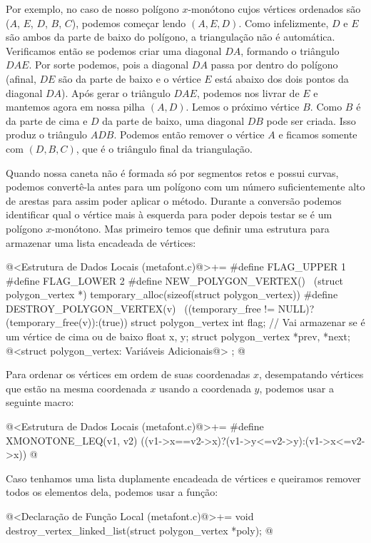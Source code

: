 {{{{{{Por exemplo, no caso de nosso polígono $x$-monótono cujos vértices
    ordenados são ($A$, $E$, $D$, $B$, $C$), podemos começar lendo $(A, E,
D)$. Como infelizmente, $D$ e $E$ são ambos da parte de baixo do
polígono, a triangulação não é automática. Verificamos então se
podemos criar uma diagonal $DA$, formando o triângulo $DAE$. Por sorte
podemos, pois a diagonal $DA$ passa por dentro do polígono (afinal,
$DE$ são da parte de baixo e o vértice $E$ está abaixo dos dois pontos
da diagonal $DA$). Após gerar o triângulo $DAE$, podemos nos livrar de
$E$ e mantemos agora em nossa pilha $(A, D)$. Lemos o próximo vértice
$B$. Como $B$ é da parte de cima e $D$ da parte de baixo, uma diagonal
$DB$ pode ser criada. Isso produz o triângulo $ADB$. Podemos então
remover o vértice $A$ e ficamos somente com $(D, B, C)$, que é o
triângulo final da triangulação.

Quando nossa caneta não é formada só por segmentos retos e possui
curvas, podemos convertê-la antes para um polígono com um número
suficientemente alto de arestas para assim poder aplicar o
método. Durante a conversão podemos identificar qual o vértice mais à
esquerda para poder depois testar se é um polígono $x$-monótono. Mas
primeiro temos que definir uma estrutura para armazenar uma lista
encadeada de vértices:

\iniciocodigo
@<Estrutura de Dados Locais (metafont.c)@>+=
#define FLAG_UPPER 1
#define FLAG_LOWER 2
#define NEW_POLYGON_VERTEX() \
  (struct polygon_vertex *) temporary_alloc(sizeof(struct polygon_vertex))
#define DESTROY_POLYGON_VERTEX(v) \
  ((temporary_free != NULL)?(temporary_free(v)):(true))
struct polygon_vertex{
  int flag; // Vai armazenar se é um vértice de cima ou de baixo
  float x, y;
  struct polygon_vertex *prev, *next;
  @<struct polygon\_vertex: Variáveis Adicionais@>
};
@
\fimcodigo

Para ordenar os vértices em ordem de suas coordenadas $x$,
desempatando vértices que estão na mesma coordenada $x$ usando a
coordenada $y$, podemos usar a seguinte macro:

\iniciocodigo
@<Estrutura de Dados Locais (metafont.c)@>+=
#define XMONOTONE_LEQ(v1, v2) ((v1->x==v2->x)?(v1->y<=v2->y):(v1->x<=v2->x))
@
\fimcodigo

Caso tenhamos uma lista duplamente encadeada de vértices e queiramos
remover todos os elementos dela, podemos usar a função:

\iniciocodigo
@<Declaração de Função Local (metafont.c)@>+=
void destroy_vertex_linked_list(struct polygon_vertex *poly);
@
\fimcodigo

}}}}}}
